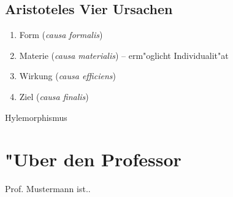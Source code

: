 \documentclass[emulatestandardclasses]{scrartcl}
\begin{document}
\subsection{Aristoteles Vier Ursachen}

\begin{enumerate}
  \item Form (\emph{causa formalis})
  \item Materie (\emph{causa materialis}) -- erm"oglicht Individualit"at
  \item Wirkung (\emph{causa efficiens})
  \item Ziel (\emph{causa finalis})
\end{enumerate}

Hylemorphismus


\newpage
\section{"Uber den Professor}
Prof. Mustermann ist..


\end{document}
